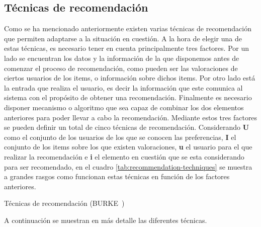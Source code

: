 \subsection{Técnicas de recomendación}
Como se ha mencionado anteriormente existen varias técnicas de recomendación que permiten adaptarse a la situación en cuestión. A la hora de elegir una de estas técnicas, es necesario tener en cuenta principalmente tres factores. Por un lado se encuentran los datos y la información de la que disponemos antes de comenzar el proceso de recomendación, como pueden ser las valoraciones de ciertos usuarios de los items, o información sobre dichos items. Por otro lado está la entrada que realiza el usuario,  es decir la información que este comunica al sistema con el propósito de obtener una recomendación. Finalmente es necesario disponer mecanismo o algoritmo que sea capaz de combinar los dos elementos anteriores para poder llevar a cabo la recomendación. Mediante estos tres factores se pueden definir un total de cinco técnicas de recomendación. Considerando \textbf{U} como el conjunto de los usuarios de los que se conocen las preferencias, \textbf{I} el conjunto de los items sobre los que existen valoraciones, \textbf{u} el usuario para el que realizar la recomendación e \textbf{i} el elemento en cuestión que se esta considerando para ser recomendado, en el cuadro \ref{tab:recommendation-techniques} se muestra a grandes rasgos como funcionan estas técnicas en función de los factores anteriores. 


\begin{table}[hp]
  \centering
  {\small
  
  }
  \caption[Técnicas de recomendación]
  {Técnicas de recomendación
    (\textsc{BURKE}~\cite{Burke})}
  \label{tab:recommendation-techniques}
\end{table}

A continuación se muestran en más detalle las diferentes técnicas.

